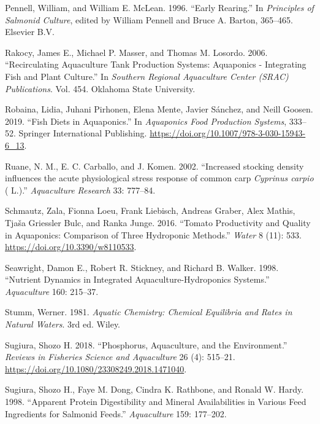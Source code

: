 \documentclass[preprint, 3p,
authoryear]{elsarticle} %
\newlength{\cslhangindent}
\newlength{\cslentryspacingunit} %
\newenvironment{CSLReferences}[2] %
 {%
  \setlength{\parindent}{0pt}
  \ifodd #1
  \let\oldpar\par
  \def\par{\hangindent=\cslhangindent\oldpar}
  \fi
  \setlength{\parskip}{#2\cslentryspacingunit}
 }%
 {}
\begin{document}
\begin{CSLReferences}{1}{0}
\leavevmode{}%
Pennell, William, and William E. McLean. 1996. {``Early Rearing.''} In
\emph{Principles of Salmonid Culture}, edited by William Pennell and
Bruce A. Barton, 365--465. Elsevier B.V.

\leavevmode{}%
Rakocy, James E., Michael P. Masser, and Thomas M. Losordo. 2006.
{``Recirculating Aquaculture Tank Production Systems: Aquaponics -
Integrating Fish and Plant Culture.''} In \emph{Southern Regional
Aquaculture Center (SRAC) Publications}. Vol. 454. Oklahoma State
University.

\leavevmode{}%
Robaina, Lidia, Juhani Pirhonen, Elena Mente, Javier Sánchez, and Neill
Goosen. 2019. {``{Fish Diets in Aquaponics}.''} In \emph{Aquaponics Food
Production Systems}, 333--52. Springer International Publishing.
\url{https://doi.org/10.1007/978-3-030-15943-6_13}.

\leavevmode{}%
Ruane, N. M., E. C. Carballo, and J. Komen. 2002. {``{Increased stocking
density influences the acute physiological stress response of common
carp \emph{Cyprinus carpio} ( L.)}.''} \emph{Aquaculture Research} 33:
777--84.

\leavevmode{}%
Schmautz, Zala, Fionna Loeu, Frank Liebisch, Andreas Graber, Alex
Mathis, Tjaša Griessler Bulc, and Ranka Junge. 2016. {``Tomato
Productivity and Quality in Aquaponics: Comparison of Three Hydroponic
Methods.''} \emph{Water} 8 (11): 533.
\url{https://doi.org/10.3390/w8110533}.

\leavevmode{}%
Seawright, Damon E., Robert R. Stickney, and Richard B. Walker. 1998.
{``Nutrient Dynamics in Integrated Aquaculture-Hydroponics Systems.''}
\emph{Aquaculture} 160: 215--37.

\leavevmode{}%
Stumm, Werner. 1981. \emph{Aquatic Chemistry: Chemical Equilibria and
Rates in Natural Waters}. 3rd ed. Wiley.

\leavevmode{}%
Sugiura, Shozo H. 2018. {``Phosphorus, Aquaculture, and the
Environment.''} \emph{Reviews in Fisheries Science and Aquaculture} 26
(4): 515--21. \url{https://doi.org/10.1080/23308249.2018.1471040}.

\leavevmode{}%
Sugiura, Shozo H., Faye M. Dong, Cindra K. Rathbone, and Ronald W.
Hardy. 1998. {``Apparent Protein Digestibility and Mineral
Availabilities in Various Feed Ingredients for Salmonid Feeds.''}
\emph{Aquaculture} 159: 177--202.


\end{CSLReferences}
\end{document}
